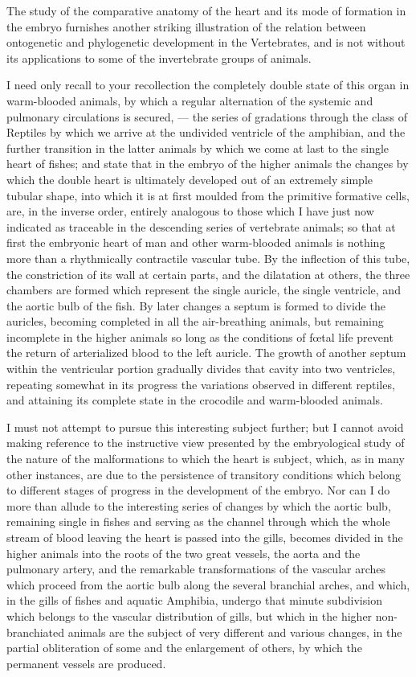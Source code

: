 \documentclass[a4paper, 11pt, oneside, english]{article}
\begin{document}
The study of the comparative anatomy of the heart and its mode of formation in the embryo furnishes another striking illustration of the relation between ontogenetic and phylogenetic development in the Vertebrates, and is not without its applications to some of the invertebrate groups of animals.

I need only recall to your recollection the completely double state of this organ in warm-blooded animals, by which a regular alternation of the systemic and pulmonary circulations is secured, --- the series of gradations through the class of Reptiles by which we arrive at the undivided ventricle of the amphibian, and the further transition in the latter animals by which we come at last to the single heart of fishes; and state that in the embryo of the higher animals the changes by which the double heart is ultimately developed out of an extremely simple tubular shape, into which it is at first moulded from the primitive formative cells, are, in the inverse order, entirely analogous to those which I have just now indicated as traceable in the descending series of vertebrate animals; so that at first the embryonic heart of man and other warm-blooded animals is nothing more than a rhythmically contractile vascular tube. By the inflection of this tube, the constriction of its wall at certain parts, and the dilatation at others, the three chambers are formed which represent the single auricle, the single ventricle, and the aortic bulb of the fish. By later changes a septum is formed to divide the auricles, becoming completed in all the air-breathing animals, but remaining incomplete in the higher animals so long as the conditions of fœtal life prevent the return of arterialized blood to the left auricle. The growth of another septum within the ventricular portion gradually divides that cavity into two ventricles, repeating somewhat in its progress the variations observed in different reptiles, and attaining its complete state in the crocodile and warm-blooded animals.

I must not attempt to pursue this interesting subject further; but I cannot avoid making reference to the instructive view presented by the embryological study of the nature of the malformations to which the heart is subject, which, as in many other instances, are due to the persistence of transitory conditions which belong to different stages of progress in the development of the embryo. Nor can I do more than allude to the interesting series of changes by which the aortic bulb, remaining single in fishes and serving as the channel through which the whole stream of blood leaving the heart is passed into the gills, becomes divided in the higher animals into the roots of the two great vessels, the aorta and the pulmonary artery, and the remarkable transformations of the vascular arches which proceed from the aortic bulb along the several branchial arches, and which, in the gills of fishes and aquatic Amphibia, undergo that minute subdivision which belongs to the vascular distribution of gills, but which in the higher non-branchiated animals are the subject of very different and various changes, in the partial obliteration of some and the enlargement of others, by which the permanent vessels are produced.
\end{document}
